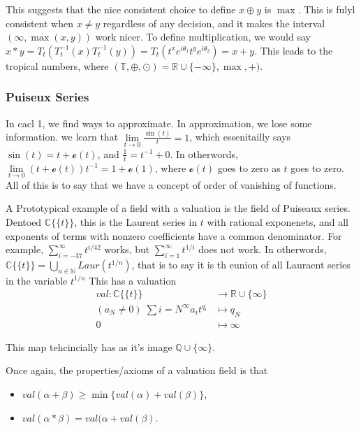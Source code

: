 \documentclass[11pt]{article}
\theoremstyle{definition}
\def\QQ{{\mathbb Q}}
\def\RR{{\mathbb R}}
\def\CC{{\mathbb C}}
\def\NN{{\mathbb N}}
\begin{document}
This suggests that the nice consistent choice to define $x\oplus y$ is $\max$. This is fulyl consistent when $x \neq y$ regardless of any decision, and it makes the interval $(\infty, \max(x,y))$ work nicer. To define multiplication, we would say $x*y = T_t(T_t^{-1}(x) T_t^{-1}(y))= T_t(t^xe^{i\theta_1}t^ye^{i\theta_2}) = x+y$. This leads to the tropical numbers, where
$(\mathbb{T}, \oplus, \odot) = \RR\cup \{-\infty\}, \max, +)$.







\subsubsection{Puiseux  Series}


In cacl 1, we find ways to approximate. In approximation, we lose some information. we learn that $\lim\limits_{t\rightarrow 0} \frac{\sin(t)}{t} =1$, which essenitailly says $\sin(t) = t+\mathscr{o}(t)$, and $\frac{1}{t} = t^{-1} + 0$. In otherwords, $\lim\limits_{t \rightarrow 0} (t+\mathscr{o}(t))t^{-1} = 1 + \mathscr{o}(1)$, where $ \mathscr{o}(t)$ goes to zero as $t$ goes to zero. All of this is to say that we have a concept of order of vanishing of functions.




A Prototypical example of a field with a valuation is the field of Puiseaux series. Dentoed $\CC\{\{t\}\}$, this is the Laurent series in $t$ with rational exponenets, and all exponents of terms with nonzero coefficients have a common denominator. For example, $\sum\limits_{i=-37}^{\infty} t^{i/42}$ works, but $\sum\limits_{i=1}^\infty t^{1/i}$ does not work. In otherwords, $\CC\{\{t\}\} = \bigcup\limits_{n \in \NN} Laur(t^{1/n})$, that is to say it is th eunion of all Lauraent series in the variable $t^{1/n}$ This has a valuation
\begin{align}
    val: \CC\{\{t\}\} &\rightarrow \RR \cup \{\infty\}
    \\
    (a_N\neq 0)\; \sum\limits{i=N}^\infty a_it^{q_i} &\mapsto q_N
    \\
    0 &\mapsto \infty
\end{align}

This map tehcincially has as it's image $\QQ \cup \{\infty\}$.


Once again, the properties/axioms of a valuation field is that
\begin{itemize}
    \item $val(\alpha + \beta) \geq \min \{val(\alpha) + val(\beta)\}$,
    \item $val(\alpha * \beta) = val(\alpha + val(\beta)$.
\end{itemize}
\end{document}

